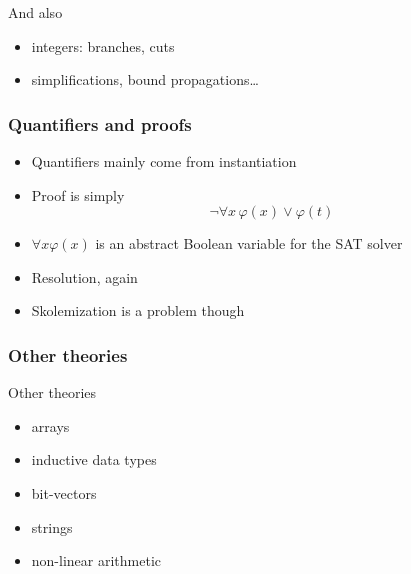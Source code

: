 \documentclass[svgnames,table,mathserif]{beamer}
\begin{document}
\begin{frame}
{And also
\begin{itemize}
\item integers: branches, cuts
\item simplifications, bound propagations\dots
\end{itemize}
}

\end{frame}


\begin{frame}
  \frametitle{Quantifiers and proofs}

  \begin{itemize}
  \item
    Quantifiers mainly come from instantiation
  \item
    Proof is simply
    \begin{displaymath}
      \neg \forall x\, \varphi(x) \vee \varphi(t)
    \end{displaymath}
  \item
    $\forall x \varphi(x)$ is an abstract Boolean variable for the SAT solver
  \item
    Resolution, again
  \item
    Skolemization is a problem though
  \end{itemize}

\end{frame}









\begin{frame}
  \frametitle{Other theories}


Other theories
\begin{itemize}
\item arrays
\item inductive data types
\item bit-vectors
\item strings
\item non-linear arithmetic
\end{itemize}

\end{frame}
\end{document}

